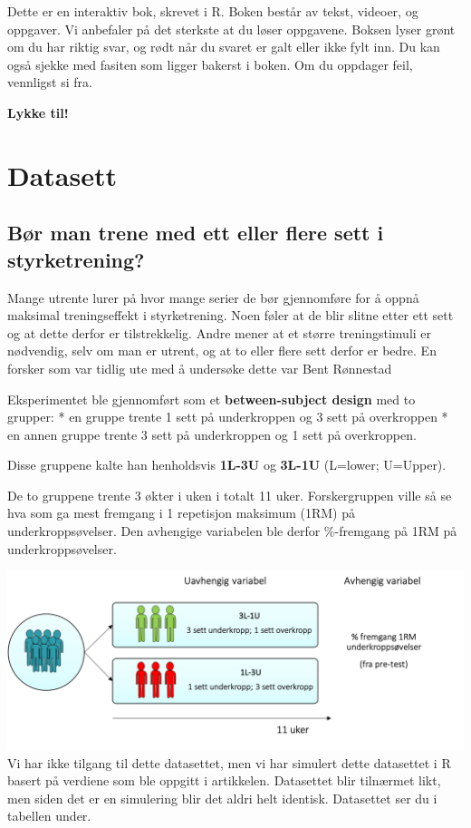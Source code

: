 \documentclass[
]{book}
\begin{document}
Dette er en interaktiv bok, skrevet i R. Boken består av tekst, videoer, og oppgaver. Vi anbefaler på det sterkste at du løser oppgavene. Boksen lyser grønt om du har riktig svar, og rødt når du svaret er galt eller ikke fylt inn. Du kan også sjekke med fasiten som ligger bakerst i boken. Om du oppdager feil, vennligst si fra.

\textbf{Lykke til!}

\hypertarget{datasett}{%
\chapter{Datasett}\label{datasett}}

\hypertarget{buxf8r-man-trene-med-ett-eller-flere-sett-i-styrketrening}{%
\section{Bør man trene med ett eller flere sett i styrketrening?}\label{buxf8r-man-trene-med-ett-eller-flere-sett-i-styrketrening}}

Mange utrente lurer på hvor mange serier de bør gjennomføre for å oppnå maksimal treningseffekt i styrketrening. Noen føler at de blir slitne etter ett sett og at dette derfor er tilstrekkelig. Andre mener at et større treningstimuli er nødvendig, selv om man er utrent, og at to eller flere sett derfor er bedre. En forsker som var tidlig ute med å undersøke dette var Bent Rønnestad \citep{ronnestad_dissimilar_2007}

Eksperimentet ble gjennomført som et \textbf{between-subject design} med to grupper:
* en gruppe trente 1 sett på underkroppen og 3 sett på overkroppen
* en annen gruppe trente 3 sett på underkroppen og 1 sett på overkroppen.

Disse gruppene kalte han henholdsvis \textbf{1L-3U} og \textbf{3L-1U} (L=lower; U=Upper).

De to gruppene trente 3 økter i uken i totalt 11 uker. Forskergruppen ville så se hva som ga mest fremgang i 1 repetisjon maksimum (1RM) på underkroppsøvelser. Den avhengige variabelen ble derfor \%-fremgang på 1RM på underkroppsøvelser.

\includegraphics{design.png}
Vi har ikke tilgang til dette datasettet, men vi har simulert dette datasettet i R basert på verdiene som ble oppgitt i artikkelen. Datasettet blir tilnærmet likt, men siden det er en simulering blir det aldri helt identisk. Datasettet ser du i tabellen under.
\end{document}
